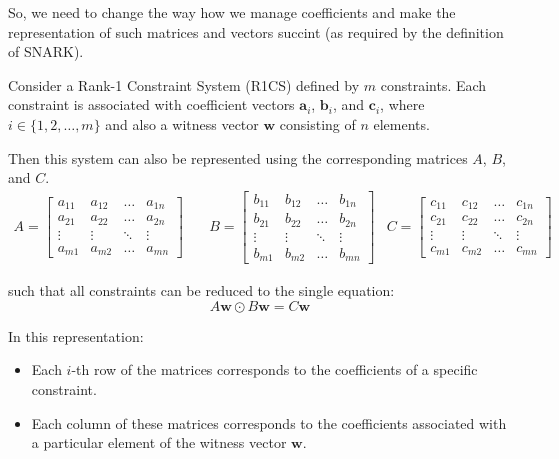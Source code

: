 \documentclass[../lecture-notes.tex]{subfiles}
\begin{document}
So, we need to change the way how we manage coefficients and make the representation of such matrices and vectors succint (as required by the definition of SNARK).

\begin{theorem} 
    Consider a Rank-1 Constraint System (R1CS) defined by $m$ constraints. Each constraint is
    associated with coefficient vectors $\mathbf{a}_i$, $\mathbf{b}_i$, and $\mathbf{c}_i$, where $i \in \{1, 2, \dots, m\}$ and
    also a witness vector $\mathbf{w}$ consisting of $n$ elements.

    Then this system can also be represented using the corresponding matrices $A$, $B$, and $C$.
    \begin{align*}
        A = \begin{bmatrix}
            a_{11} & a_{12} & \dots & a_{1n} \\
            a_{21} & a_{22} & \dots & a_{2n} \\
            \vdots & \vdots & \ddots & \vdots \\
            a_{m1} & a_{m2} & \dots & a_{mn}
        \end{bmatrix} & \quad
        B = \begin{bmatrix}
            b_{11} & b_{12} & \dots & b_{1n} \\
            b_{21} & b_{22} & \dots & b_{2n} \\
            \vdots & \vdots & \ddots & \vdots \\
            b_{m1} & b_{m2} & \dots & b_{mn}
        \end{bmatrix} & 
        C = \begin{bmatrix}
            c_{11} & c_{12} & \dots & c_{1n} \\
            c_{21} & c_{22} & \dots & c_{2n} \\
            \vdots & \vdots & \ddots & \vdots \\
            c_{m1} & c_{m2} & \dots & c_{mn}
        \end{bmatrix}
    \end{align*}

    such that all constraints can be reduced to the single equation:
    \begin{equation*}
        A\mathbf{w} \odot B\mathbf{w} = C\mathbf{w}
    \end{equation*}
    
    In this representation:
    \begin{itemize}
        \item Each $i$-th row of the matrices corresponds to the coefficients of a specific constraint.
        \item Each column of these matrices corresponds to the coefficients associated with a 
        particular element of the witness vector $\mathbf{w}$.
    \end{itemize}
\end{theorem}
\end{document}
